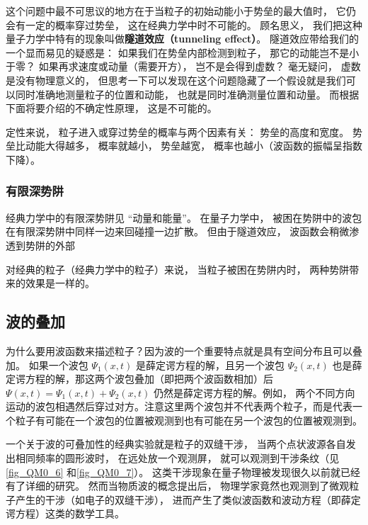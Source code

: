 这个问题中最不可思议的地方在于当粒子的初始动能小于势垒的最大值时， 它仍会有一定的概率穿过势垒， 这在经典力学中时不可能的。 顾名思义， 我们把这种量子力学中特有的现象叫做\textbf{隧道效应（tunneling effect）}。 隧道效应带给我们的一个显而易见的疑惑是： 如果我们在势垒内部检测到粒子， 那它的动能岂不是小于零？ 如果再求速度或动量（需要开方）， 岂不是会得到虚数？ 毫无疑问， 虚数是没有物理意义的， 但思考一下可以发现在这个问题隐藏了一个假设就是我们可以同时准确地测量粒子的位置和动能， 也就是同时准确测量位置和动量。 而根据下面将要介绍的不确定性原理， 这是不可能的。

定性来说， 粒子进入或穿过势垒的概率与两个因素有关： 势垒的高度和宽度。 势垒比动能大得越多， 概率就越小， 势垒越宽， 概率也越小（波函数的振幅呈指数下降）。

\subsubsection{有限深势阱}
经典力学中的有限深势阱见 “动量和能量”。 在量子力学中， 被困在势阱中的波包在有限深势阱中同样一边来回碰撞一边扩散。 但由于隧道效应， 波函数会稍微渗透到势阱的外部

对经典的粒子（经典力学中的粒子）来说， 当粒子被困在势阱内时， 两种势阱带来的效果是一样的。


\subsection{波的叠加}
为什么要用波函数来描述粒子？因为波的一个重要特点就是具有空间分布且可以叠加。 如果一个波包 $\Psi_1(x, t)$ 是薛定谔方程的解，且另一个波包 $\Psi_2(x, t)$ 也是薛定谔方程的解，那这两个波包叠加（即把两个波函数相加）后 $\Psi(x, t) = \Psi_1(x, t) + \Psi_2(x, t)$ 仍然是薛定谔方程的解。例如， 两个不同方向运动的波包相遇然后穿过对方。注意这里两个波包并不代表两个粒子，而是代表一个粒子有可能在一个波包的位置被观测到也有可能在另一个波包的位置被观测到。

一个关于波的可叠加性的经典实验就是粒子的双缝干涉， 当两个点状波源各自发出相同频率的圆形波时， 在远处放一个观测屏， 就可以观测到干涉条纹（见\autoref{fig_QM0_6} 和\autoref{fig_QM0_7}）。 这类干涉现象在量子物理被发现很久以前就已经有了详细的研究。 然而当物质波的概念提出后， 物理学家竟然也观测到了微观粒子产生的干涉（如电子的双缝干涉）， 进而产生了类似波函数和波动方程（即薛定谔方程）这类的数学工具。

